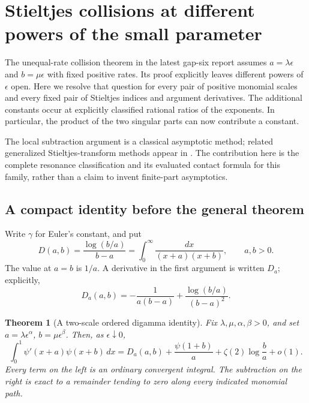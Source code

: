 \documentclass[11pt,a4paper]{article}
\numberwithin{equation}{section}
\newtheorem{theorem}{Theorem}[section]
\theoremstyle{definition}
\theoremstyle{remark}
\begin{document}
\section{Stieltjes collisions at different powers of the small parameter}
\label{mc:section}

The unequal-rate collision theorem in the latest gap-six report
\cite[Section~4 and research question~10]{GapSix} assumes
$a=\lambda\epsilon$ and $b=\mu\epsilon$ with fixed positive rates.
Its proof explicitly leaves different powers of $\epsilon$ open.
Here we resolve that question for every pair of positive monomial
scales and every fixed pair of Stieltjes indices and argument
derivatives. The additional constants occur at explicitly classified
rational ratios of the exponents. In particular, the product of the
two singular parts can now contribute a constant.

The local subtraction argument is a classical asymptotic method;
related generalized Stieltjes-transform methods appear in
\cite{TicaGalapon}. The contribution here is the complete resonance
classification and its evaluated contact formula for this family,
rather than a claim to invent finite-part asymptotics.

\subsection{A compact identity before the general theorem}

Write $\gamma$ for Euler's constant, and put
\begin{equation}\label{mc:D}
 D(a,b)=\frac{\log(b/a)}{b-a}
       =\int_0^\infty\frac{dx}{(x+a)(x+b)},\qquad a,b>0.
\end{equation}
The value at $a=b$ is $1/a$. A derivative in the first argument is
written $D_a$; explicitly,
\begin{equation}\label{mc:Da}
 D_a(a,b)=-\frac1{a(b-a)}+
                    \frac{\log(b/a)}{(b-a)^2}.
\end{equation}

\begin{theorem}[A two-scale ordered digamma identity]\label{mc:ordered-limit}
Fix $\lambda,\mu,\alpha,\beta>0$, and set
$a=\lambda\epsilon^\alpha$, $b=\mu\epsilon^\beta$.
Then, as $\epsilon\downarrow0$,
\begin{equation}\label{mc:ordered-uniform}
 \boxed{\displaystyle
 \int_0^1\psi'(x+a)\psi(x+b)\,dx
 =D_a(a,b)+\frac{\psi(1+b)}a
                   +\zeta(2)\log\frac ba+o(1).}
\end{equation}
Every term on the left is an ordinary convergent integral. The
subtraction on the right is exact to a remainder tending to zero
along every indicated monomial path.
\end{theorem}
\end{document}

